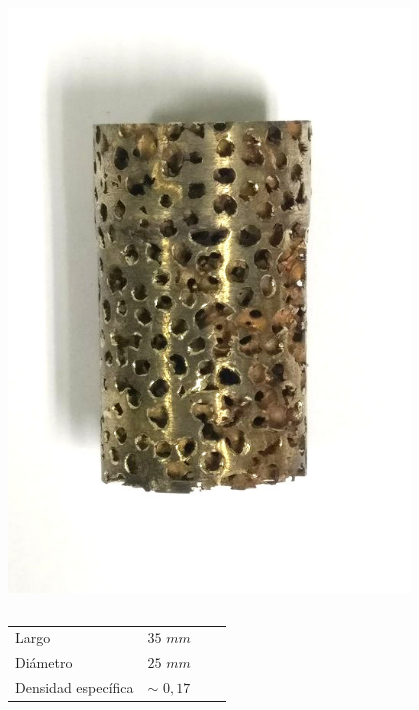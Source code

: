 \documentclass[usenames,dvipsnames]{beamer}
\begin{document}
\begin{frame}
\begin{center}
\begin{columns}
\includegraphics[width=0.8\textwidth]{img/proceso/proceso3.jpg}
\end{columns}
\vspace{1cm}

 \begin{center}
 \begin{small}
\begin{tabular}{@{}llll@{}}  \toprule
Largo &     $35$ $mm$    \\
Diámetro  & $25$ $mm$   \\
Densidad específica  & $\sim$ $0,17$     \\
\bottomrule
\end{tabular}
\end{small}
 \end{center}



\end{center}
\end{frame}
\end{document}
